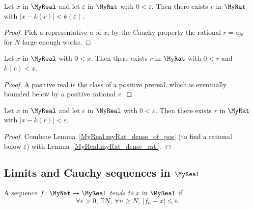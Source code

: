 \begin{lemma}
    \label{MyReal.myRat_dense_rat'}
    \leanok
    Let $x$ in $\MyReal$ and let $\varepsilon$ in $\MyRat$ with $0 < \varepsilon$. Then there exists
    $r$ in $\MyRat$ with $|x - k(r)| < k(\varepsilon)$.
\end{lemma}
\begin{proof}
    \leanok
    Pick a representative $a$ of $x$; by the Cauchy property the rational $r = a_N$ for $N$ large
    enough works.
\end{proof}

\begin{lemma}
    \label{MyReal.myRat_dense_of_pos}
    \leanok
    Let $x$ in $\MyReal$ with $0 < x$. Then there exists $r$ in $\MyRat$ with $0 < r$ and $k(r) < x$.
\end{lemma}
\begin{proof}
    \leanok
    A positive real is the class of a positive prereal, which is eventually bounded below by a
    positive rational $r$.
\end{proof}

\begin{lemma}
    \label{MyReal.myRat_dense_rat}
    \leanok
    Let $x$ in $\MyReal$ and let $\varepsilon$ in $\MyReal$ with $0 < \varepsilon$. Then there exists
    $r$ in $\MyRat$ with $|x - k(r)| < \varepsilon$.
\end{lemma}
\begin{proof}
    \leanok
    Combine Lemma~\ref{MyReal.myRat_dense_of_pos} (to find a rational below $\varepsilon$) with
    Lemma~\ref{MyReal.myRat_dense_rat'}.
\end{proof}

\subsection{Limits and Cauchy sequences in \texorpdfstring{$\MyReal$}{the reals}}

\begin{definition}
    \label{MyReal.TendsTo}
    \leanok
A sequence $f \colon \MyNat \to \MyReal$ \emph{tends to} $x$ in $\MyReal$ if
\[
\forall \varepsilon > 0, \ \exists N, \ \forall n \geq N, \ |f_n - x| \leq \varepsilon.
\]
\end{definition}

